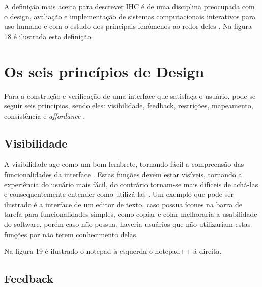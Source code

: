 \documentclass[12pt,oneside,a4paper,chapter=TITLE,section=TITLE,sumario=tradicional]{abntex2}
\begin{document}
A definição mais aceita para descrever IHC é de uma disciplina preocupada com o design, avaliação e implementação de sistemas computacionais interativos para uso humano e com o estudo dos principais fenômenos ao redor deles \cite{rocha2003}. Na figura 18 é ilustrada esta definição.

\begin{figure}[htb]
\end{figure}

\section{Os seis princípios de Design}
\label{sec:seisprincipios}

Para a construção e verificação de uma interface que satisfaça o usuário, pode-se seguir seis princípios, sendo eles: visibilidade, feedback, restrições, mapeamento, consistência e \textit{affordance} \cite{norman2002}.

\subsection{Visibilidade}
\label{sec:visibilidade}

A visibilidade age como um bom lembrete, tornando fácil a compreensão das funcionalidades da interface \cite{norman2002}. Estas funções devem estar visíveis, tornando a experiência do usuário mais fácil, do contrário tornam-se mais difíceis de achá-las e consequentemente entender como utilizá-las \cite{agni2015}. Um exemplo que pode ser ilustrado é a interface de um editor de texto, caso possua ícones na barra de tarefa para funcionalidades simples, como copiar e colar melhoraria a usabilidade do software, porém caso não possua, haveria usuários que não utilizariam estas funções por não terem conhecimento delas.

Na figura 19 é ilustrado o notepad à esquerda o notepad++ á direita.

\begin{figure}[htb]
\end{figure}

\subsection{Feedback}
\label{sec:feedback}
\end{document}
